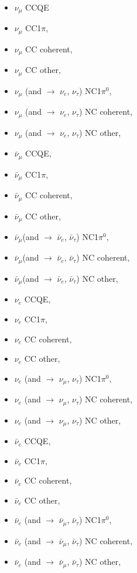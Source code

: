 \begin{itemize}
\item  $\nu_{\mu}$ CCQE
\item  $\nu_{\mu}$ CC1$\pi$, 
\item  $\nu_{\mu}$ CC coherent, 
\item  $\nu_{\mu}$ CC other, 
\item  $\nu_{\mu}$ (and $\rightarrow$ $\nu_{e}$, $\nu_{\tau}$) NC1$\pi^{0}$, 
\item  $\nu_{\mu}$ (and $\rightarrow$ $\nu_{e}$, $\nu_{\tau}$) NC coherent, 
\item  $\nu_{\mu}$ (and $\rightarrow$ $\nu_{e}$, $\nu_{\tau}$) NC other, 
\item  $\bar{\nu}_{\mu}$ CCQE, 
\item  $\bar{\nu}_{\mu}$ CC1$\pi$, 
\item  $\bar{\nu}_{\mu}$ CC coherent, 
\item  $\bar{\nu}_{\mu}$ CC other, 
\item  $\bar{\nu}_{\mu}$(and $\rightarrow$ $\bar{\nu}_{e}$, $\bar{\nu}_{\tau}$) NC1$\pi^{0}$, 
\item  $\bar{\nu}_{\mu}$(and $\rightarrow$ $\bar{\nu}_{e}$, $\bar{\nu}_{\tau}$) NC coherent, 
\item  $\bar{\nu}_{\mu}$(and $\rightarrow$ $\bar{\nu}_{e}$, $\bar{\nu}_{\tau}$) NC other, 
\item  $\nu_{e}$ CCQE, 
\item  $\nu_{e}$ CC1$\pi$,
\item  $\nu_{e}$ CC coherent,
\item  $\nu_{e}$ CC other,
\item  $\nu_{e}$ (and $\rightarrow$ $\nu_{\mu}$, $\nu_{\tau}$) NC1$\pi^{0}$,
\item  $\nu_{e}$ (and $\rightarrow$ $\nu_{\mu}$, $\nu_{\tau}$) NC coherent,
\item  $\nu_{e}$ (and $\rightarrow$ $\nu_{\mu}$, $\nu_{\tau}$) NC other,
\item  $\bar{\nu}_{e}$ CCQE, 
\item  $\bar{\nu}_{e}$ CC1$\pi$,
\item  $\bar{\nu}_{e}$ CC coherent,
\item  $\bar{\nu}_{e}$ CC other,
\item  $\bar{\nu}_{e}$ (and $\rightarrow$ $\bar{\nu}_{\mu}$, $\bar{\nu}_{\tau}$) NC1$\pi^{0}$,
\item  $\bar{\nu}_{e}$ (and $\rightarrow$ $\bar{\nu}_{\mu}$, $\bar{\nu}_{\tau}$) NC coherent,
\item  $\bar{\nu}_{e}$ (and $\rightarrow$ $\bar{\nu}_{\mu}$, $\bar{\nu}_{\tau}$) NC other,

\end{itemize}
